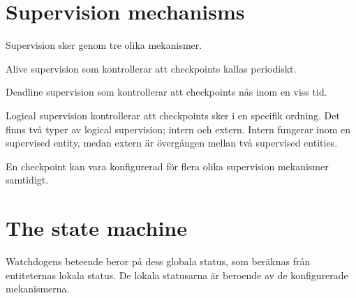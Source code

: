 \documentclass[a4paper]{article}
\begin{document}



\section{Supervision mechanisms}
Supervision sker genom tre olika mekanismer.

Alive supervision som kontrollerar att checkpoints kallas periodiskt.

Deadline supervision som kontrollerar att checkpoints nås inom en viss
tid.

Logical supervision kontrollerar att checkpoints sker i en specifik
ordning. Det finns två typer av logical supervision; intern och
extern. Intern fungerar inom en supervised entity, medan extern är
övergången mellan två supervised entities.

En checkpoint kan vara konfigurerad för flera olika supervision
mekanismer samtidigt.





\section{The state machine}
Watchdogens beteende beror på dess globala status, som beräknas från
entiteternas lokala status. De lokala statusarna är beroende av de
konfigurerade mekanismerna.


\end{document}
